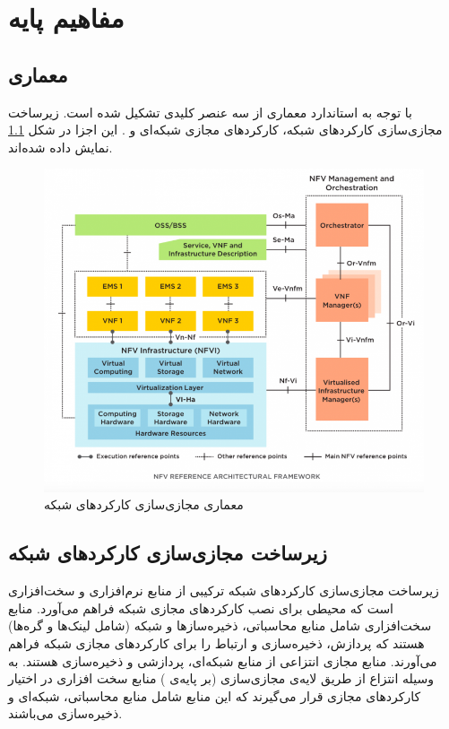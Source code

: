 \chapter{مفاهیم پایه}

\section{معماری }
با توجه به استاندارد  معماری 
از سه عنصر کلیدی تشکیل شده است.
زیرساخت مجازی‌سازی کارکردهای شبکه،
کارکردهای مجازی شبکه‌ای و
.
این اجزا در شکل \cref{fig.1} نمایش داده شده‌اند.

\begin{figure}[!h]
\center\includegraphics[scale=.5]{images/nfv-arch}
\caption{معماری مجازی‌سازی کارکردهای شبکه
}\label{fig.1}
\end{figure}

\section{زیرساخت مجازی‌سازی کارکردهای شبکه}
زیرساخت مجازی‌سازی کارکردهای شبکه ترکیبی از منابع نرم‌افزاری و سخت‌افزاری است
که محیطی برای نصب
کارکردهای مجازی شبکه فراهم می‌آورد.
منابع سخت‌افزاری شامل منابع محاسباتی،
ذخیره‌سازها و شبکه
(شامل لینک‌ها و گره‌ها)
هستند
که پردازش، ذخیره‌سازی و ارتباط را
برای کارکردهای مجازی شبکه فراهم می‌آورند.
منابع مجازی انتزاعی از منابع شبکه‌ای، پردازشی و ذخیر‌ه‌سازی هستند.
به وسیله انتزاع از طریق لایه‌ی مجازی‌سازی (بر پایه‌ی )
منابع سخت افزاری در اختیار کارکردهای مجازی
قرار می‌گیرند که این منابع شامل منابع محاسباتی، شبکه‌ای و ذخیره‌سازی می‌باشند.

